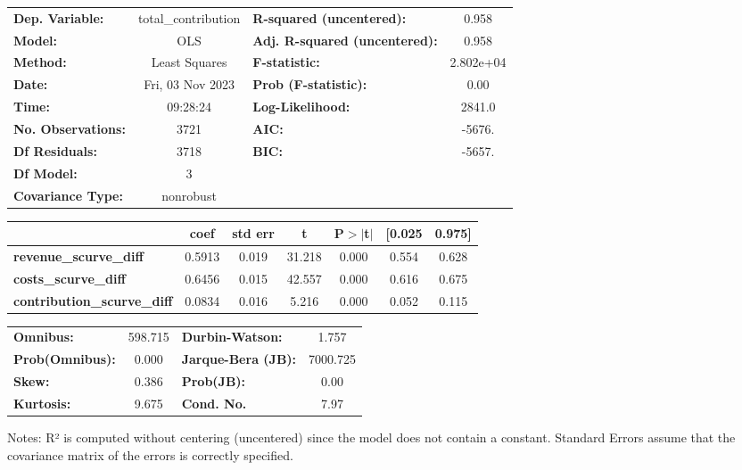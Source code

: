 \begin{center}
\begin{tabular}{lclc}
\toprule
\textbf{Dep. Variable:}             & total\_contribution & \textbf{  R-squared (uncentered):}      &     0.958   \\
\textbf{Model:}                     &         OLS         & \textbf{  Adj. R-squared (uncentered):} &     0.958   \\
\textbf{Method:}                    &    Least Squares    & \textbf{  F-statistic:       }          & 2.802e+04   \\
\textbf{Date:}                      &   Fri, 03 Nov 2023  & \textbf{  Prob (F-statistic):}          &     0.00    \\
\textbf{Time:}                      &       09:28:24      & \textbf{  Log-Likelihood:    }          &    2841.0   \\
\textbf{No. Observations:}          &          3721       & \textbf{  AIC:               }          &    -5676.   \\
\textbf{Df Residuals:}              &          3718       & \textbf{  BIC:               }          &    -5657.   \\
\textbf{Df Model:}                  &             3       & \textbf{                     }          &             \\
\textbf{Covariance Type:}           &      nonrobust      & \textbf{                     }          &             \\
\bottomrule
\end{tabular}
\begin{tabular}{lcccccc}
                                    & \textbf{coef} & \textbf{std err} & \textbf{t} & \textbf{P$> |$t$|$} & \textbf{[0.025} & \textbf{0.975]}  \\
\midrule
\textbf{revenue\_scurve\_diff}      &       0.5913  &        0.019     &    31.218  &         0.000        &        0.554    &        0.628     \\
\textbf{costs\_scurve\_diff}        &       0.6456  &        0.015     &    42.557  &         0.000        &        0.616    &        0.675     \\
\textbf{contribution\_scurve\_diff} &       0.0834  &        0.016     &     5.216  &         0.000        &        0.052    &        0.115     \\
\bottomrule
\end{tabular}
\begin{tabular}{lclc}
\textbf{Omnibus:}       & 598.715 & \textbf{  Durbin-Watson:     } &    1.757  \\
\textbf{Prob(Omnibus):} &   0.000 & \textbf{  Jarque-Bera (JB):  } & 7000.725  \\
\textbf{Skew:}          &   0.386 & \textbf{  Prob(JB):          } &     0.00  \\
\textbf{Kurtosis:}      &   9.675 & \textbf{  Cond. No.          } &     7.97  \\
\bottomrule
\end{tabular}
\end{center}

Notes: \newline
 [1] R² is computed without centering (uncentered) since the model does not contain a constant. \newline
 [2] Standard Errors assume that the covariance matrix of the errors is correctly specified.